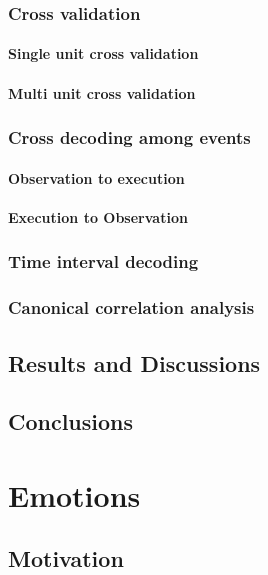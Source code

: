 \documentclass[a4,12pt]{ozu-thesis}
\begin{document}
\subsection{Cross validation}

\subsubsection{Single unit cross validation}
\subsubsection{Multi unit cross validation}

\subsection{Cross decoding among events}
\subsubsection{Observation to execution}
\subsubsection{Execution to Observation}

\subsection{Time interval decoding}

\subsection{Canonical correlation analysis}

\section{Results and Discussions}


\section{Conclusions}

\chapter{Emotions}
\section{Motivation}

\end{document}
